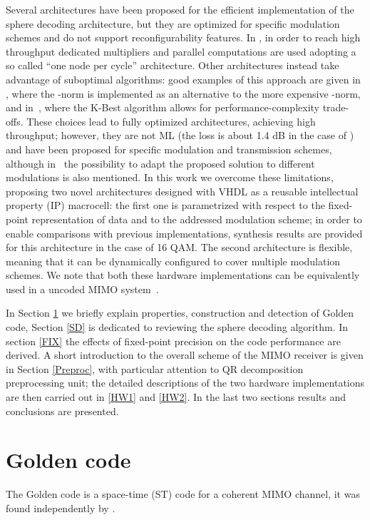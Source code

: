 \documentclass[12pt,onecolumn,draftclsnofoot]{IEEEtran}
\begin{document}
Several architectures have been proposed for the efficient
implementation of the sphere decoding architecture, but they are
optimized for specific modulation schemes and do not support
reconfigurability features. In \cite[ASIC-I]{ethvlsi}, in order
to reach high throughput dedicated multipliers and parallel
computations are used adopting a so called ``one node per cycle''
architecture. Other architectures instead take advantage of suboptimal algorithms: good examples of this
approach are given in \cite[ASIC-II]{ethvlsi},
where the -norm is implemented as an alternative to the more expensive
-norm, and in~\cite{lundvlsi}, where the K-Best algorithm allows for
performance-complexity trade-offs.
These choices lead to fully optimized architectures,
achieving high throughput; however, they are not ML 
(the loss is about 1.4 dB in the case of  \cite[ASIC-II]{ethvlsi}) and have
been proposed for specific modulation and transmission schemes, 
although in~\cite{ethvlsi} the possibility to adapt the proposed solution to 
different modulations is also mentioned.
In this work we
overcome these limitations, proposing two novel architectures
designed with VHDL as a reusable intellectual property (IP)
macrocell: the first one is parametrized with respect to the
fixed-point representation of data and to the addressed modulation
scheme; in order to enable comparisons with previous
implementations, synthesis results are provided for this
architecture in the case of 16 QAM. The second architecture is
flexible, meaning that it can be dynamically configured to cover
multiple modulation schemes. We note that both these hardware
implementations can be equivalently used in a  uncoded MIMO system~\cite{gigabit2}.


 In Section \ref{GC} we briefly explain properties,
construction and detection of Golden code, Section \ref{SD} is
dedicated to reviewing the sphere decoding algorithm. In
section \ref{FIX} the effects of fixed-point precision on the code
performance are derived. A short introduction to the overall scheme
of the MIMO receiver is given in Section \ref{Preproc}, with
particular attention to QR decomposition preprocessing unit; the
detailed descriptions of the two hardware implementations are then
carried out in \ref{HW1} and \ref{HW2}. In the last two sections
results and conclusions are presented.





\section{Golden code}
\label{GC}
The Golden code is a space-time (ST) code for a  coherent MIMO channel,
it was found independently by \cite{Golden1, Golden2, Golden3}.
\end{document}
